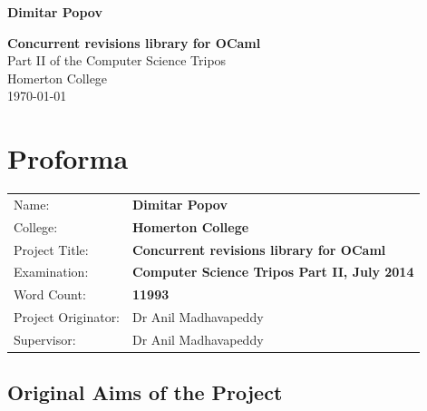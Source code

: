 \documentclass[12pt,twoside,notitlepage]{report}
\begin{document}





\pagestyle{empty}

\hfill{\LARGE \bf Dimitar Popov}

\vspace*{60mm}
\begin{center}
\Huge
{\bf Concurrent revisions library for OCaml} \\
\vspace*{5mm}
Part II of the Computer
Science Tripos\\
\vspace*{5mm}
Homerton College \\
\vspace*{5mm}
\today  %
\end{center}

\cleardoublepage


\setcounter{page}{1}
\pagestyle{plain}

\chapter*{Proforma}

{\large
\begin{tabular}{ll} 
Name:               & \bf Dimitar Popov                     \\
College:            & \bf Homerton College                     \\
Project Title:      & \bf Concurrent revisions library for OCaml \\
Examination:        & \bf Computer Science Tripos Part II, July 2014        \\
Word Count:         & \bf 11993\footnotemark[1]
\\
Project Originator: & Dr Anil Madhavapeddy                    \\
Supervisor:         & Dr Anil Madhavapeddy                    \\ 
\end{tabular}
}


\section*{Original Aims of the Project}
\end{document}
